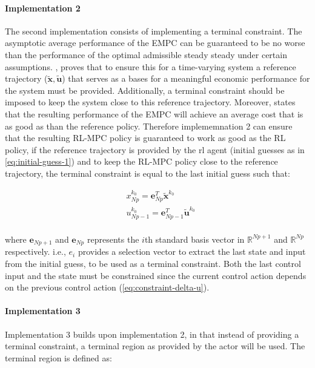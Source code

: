 \paragraph{Implementation 2}
The second implementation consists of implementing a terminal constraint. The asymptotic average performance of the EMPC can be guaranteed to be no worse than the performance of the optimal admissible steady steady under certain assumptions. \cite{risbeckEconomicModelPredictive2020}, \cite{amritEconomicOptimizationUsing2011} proves that to ensure this for a time-varying system a reference trajectory ($\tilde{\mathbf{x}},\tilde{\mathbf{u}}$) that serves as a bases for a meaningful economic performance for the system must be provided. Additionally, a terminal constraint should be imposed to keep the system close to this reference trajectory. Moreover, \cite{risbeckEconomicModelPredictive2020} states that the resulting performance of the EMPC will achieve an average cost that is as good as than the reference policy. Therefore implememnation 2 can ensure that the resulting RL-MPC policy is guaranteed to work as good as the RL policy, if the reference trajectory is provided by the rl agent (initial guesses as in \autoref{eq:initial-guess-1}) and to keep the RL-MPC policy close to the reference trajectory, the terminal constraint is equal to the last initial guess such that:

\begin{equation}\label{eq:terminal-constraint-ocp}
	\begin{aligned}
		& x^{k_0}_{Np} = \mathbf{e}_{Np}^T \tilde{\mathbf{x}}^{k_0}\\
		& u^{k_0}_{Np-1} = \mathbf{e}_{Np-1}^T\tilde{\mathbf{u}}^{k_0}\\
	\end{aligned}
\end{equation}

where $\mathbf{e}_{Np+1}$ and $\mathbf{e}_{Np}$ represents the $i$th standard basis vector in $\mathbb{R}^{Np+1}$ and $\mathbb{R}^{Np}$ respectively. i.e., $e_i$ provides a selection vector to extract the last state and input from the initial guess, to be used as a terminal constraint. Both the last control input and the state must be constrained since the current control action depends on the previous control action (\autoref{eq:constraint-delta-u}).

\paragraph{Implementation 3}
Implementation 3 builds upon implementation 2, in that instead of providing a terminal constraint, a terminal region as provided by the actor will be used. The terminal region is defined as:

